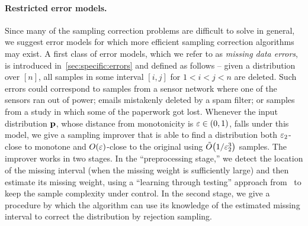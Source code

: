 \paragraph{Restricted error models.}
Since many of the sampling correction problems are 
difficult to solve in general, we suggest error models
for which more efficient sampling correction algorithms
may exist. A first class of error models, which we refer to
as  \emph{missing data errors}, is introduced in~\cref{sec:specific:errors} and defined as follows -- given a distribution
over $[n]$, all samples in some interval $[i,j]$ for $1<i<j<n$ are
deleted.  Such errors could correspond to samples from a sensor
network where one of the sensors ran out of power; 
emails mistakenly deleted by a spam filter; or samples
from a study in which some of the paperwork got lost.
Whenever the input distribution $\mathbf{p}$, 
whose distance from monotonicity is {$\varepsilon\in(0,1)$}, 
falls under this model, we give a sampling improver that is able to find 
a distribution both $\varepsilon_2$-close to monotone
 and $\bigO{\eps}$-close to the original 
using $\tildeO{{1}/{\eps_2^{3}}}$ samples. 
The improver works in two stages. In the ``preprocessing stage,'' 
 we detect the location of the missing interval 
(when the missing weight is sufficiently large) 
and then estimate its missing weight, using a 
``learning through testing'' approach from~\cite{DDS:12} to keep the sample complexity under control. 
In the second stage, 
we give a procedure 
by which the algorithm can use its knowledge
of the estimated missing interval to
 correct the distribution by rejection sampling.
 
